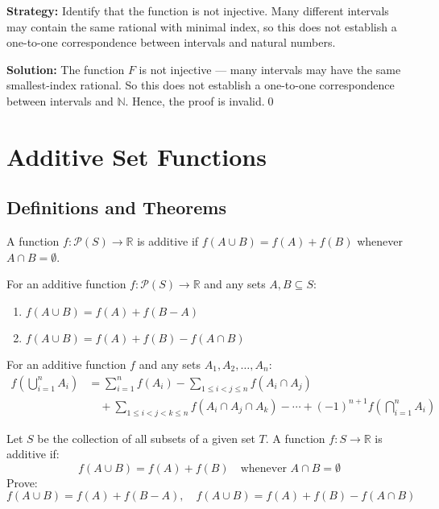 \noindent\textbf{Strategy:} Identify that the function is not injective. Many different intervals may contain the same rational with minimal index, so this does not establish a one-to-one correspondence between intervals and natural numbers.

\bigskip\noindent\textbf{Solution:}  
The function \( F \) is not injective — many intervals may have the same smallest-index rational.  
So this does not establish a one-to-one correspondence between intervals and \( \mathbb{N} \).  
Hence, the proof is invalid.\qed

\section{Additive Set Functions}

\subsection*{Definitions and Theorems}

\begin{definition}
A function $f: \mathcal{P}(S) \to \mathbb{R}$ is additive if $f(A \cup B) = f(A) + f(B)$ whenever $A \cap B = \emptyset$.
\end{definition}

\begin{theorem}
For an additive function $f: \mathcal{P}(S) \to \mathbb{R}$ and any sets $A, B \subseteq S$:
\begin{enumerate}
\item $f(A \cup B) = f(A) + f(B - A)$
\item $f(A \cup B) = f(A) + f(B) - f(A \cap B)$
\end{enumerate}
\end{theorem}

\begin{theorem}
For an additive function $f$ and any sets $A_1, A_2, \ldots, A_n$:
\begin{align*}
f\left(\bigcup_{i=1}^n A_i\right) &= \sum_{i=1}^n f(A_i) - \sum_{1 \leq i < j \leq n} f(A_i \cap A_j) \\
&\quad + \sum_{1 \leq i < j < k \leq n} f(A_i \cap A_j \cap A_k) - \cdots + (-1)^{n+1} f\left(\bigcap_{i=1}^n A_i\right)
\end{align*}
\end{theorem}



\begin{problembox}
Let \( S \) be the collection of all subsets of a given set \( T \).  
A function \( f: S \to \mathbb{R} \) is additive if:
\[
f(A \cup B) = f(A) + f(B)
\quad \text{whenever } A \cap B = \emptyset
\]  
Prove:  
\[
f(A \cup B) = f(A) + f(B - A), \quad 
f(A \cup B) = f(A) + f(B) - f(A \cap B)
\]
\end{problembox}

